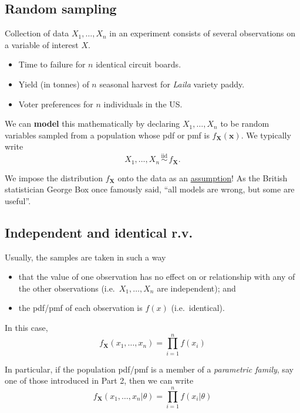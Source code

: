 \documentclass[
]{book}
\providecommand{\tightlist}{%
  \setlength{\itemsep}{0pt}\setlength{\parskip}{0pt}}
\newcommand{\bx}{{\boldsymbol x}}
\newcommand{\bX}{{\boldsymbol X}}
\newcommand{\iid}{\,\overset{\text{iid}}{\sim}\,}
\theoremstyle{definition}
\theoremstyle{definition}
\theoremstyle{definition}
\theoremstyle{definition}
\theoremstyle{remark}
\begin{document}
\hypertarget{random-sampling}{%
\subsection{Random sampling}\label{random-sampling}}

Collection of data \(X_1,\dots,X_n\) in an experiment consists of several observations on a variable of interest \(X\).

\begin{itemize}
\tightlist
\item
  Time to failure for \(n\) identical circuit boards.
\item
  Yield (in tonnes) of \(n\) seasonal harvest for \emph{Laila} variety paddy.
\item
  Voter preferences for \(n\) individuals in the US.
\end{itemize}

We can \textbf{model} this mathematically by declaring \(X_1,\dots,X_n\) to be random variables sampled from a population whose pdf or pmf is \(f_{\bX}(\bx)\).
We typically write
\[
X_1,\dots,X_n \iid f_{\bX}.
\]

We impose the distribution \(f_{\bX}\) onto the data as an \uline{assumption}!
As the British statistician George Box once famously said, ``all models are wrong, but some are useful''.

\hypertarget{independent-and-identical-r.v.}{%
\subsection{Independent and identical r.v.}\label{independent-and-identical-r.v.}}

Usually, the samples are taken in such a way

\begin{itemize}
\tightlist
\item
  that the value of one observation has no effect on or relationship with any of the other observations (i.e.~\(X_1,\dots,X_n\) are independent); and
\item
  the pdf/pmf of each observation is \(f(x)\) (i.e.~identical).
\end{itemize}

In this case,
\[
f_{\bX}(x_1,\dots,x_n) = \prod_{i=1}^n f(x_i)
\]

In particular, if the population pdf/pmf is a member of a \emph{parametric family}, say one of those introduced in Part 2, then we can write
\[
f_{\bX}(x_1,\dots,x_n|\theta) = \prod_{i=1}^n f(x_i|\theta)
\]
\end{document}
